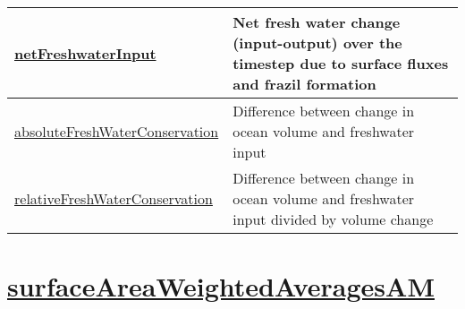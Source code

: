 {\begin{center}
\begin{longtable}{| p{2.0in} | p{4.0in} |}
    \hline
    \hyperref[subsec:var_sec_globalStatsAM_netFreshwaterInput]{netFreshwaterInput} & Net fresh water change (input-output) over the timestep due to surface fluxes and frazil formation \\
    \hline
    \hyperref[subsec:var_sec_globalStatsAM_absoluteFreshWaterConservation]{absoluteFreshWaterConservation} & Difference between change in ocean volume and freshwater input \\
    \hline
    \hyperref[subsec:var_sec_globalStatsAM_relativeFreshWaterConservation]{relativeFreshWaterConservation} & Difference between change in ocean volume and freshwater input divided by volume change \\
    \hline
\end{longtable}
\end{center}
}
\section[surfaceAreaWeightedAveragesAM]{\hyperref[sec:var_sec_surfaceAreaWeightedAveragesAM]{surfaceAreaWeightedAveragesAM}}
\label{sec:var_tab_surfaceAreaWeightedAveragesAM}
\vspace{0.5in}
